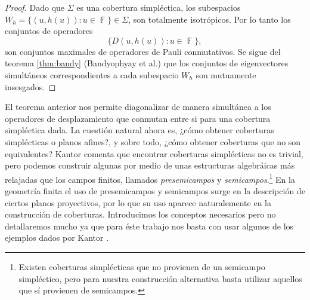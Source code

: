 \documentclass[a4paper,11pt]{report}
\DeclareMathOperator{\F}{\mathbb{F}}
\DeclareMathOperator{\tr}{tr}
\begin{document}
  \begin{proof}
    Dado que $\Sigma$ es una cobertura simpléctica, los
    subespacios $W_h = \{(u, h(u)) : u \in \F\} \in \Sigma$,
    son totalmente isotrópicos. Por lo tanto los conjuntos
    de operadores
    \[
      \{D(u,h(u)) : u \in \F\}, 
    \] 
    son conjuntos maximales de operadores de Pauli
    conmutativos. Se sigue del teorema \ref{thm:bandy}
    (Bandyophyay et al.) que los conjuntos de eigenvectores
    simultáneos correspondientes a cada subespacio $W_h$ son
    mutuamente insesgados.
  \end{proof}
  El teorema anterior nos permite diagonalizar de manera
  simultánea a los operadores de desplazamiento que conmutan
  entre si para una cobertura simpléctica dada.  La cuestión
  natural ahora es, ¿cómo obtener coberturas simplécticas o
  planos afines?, y sobre todo, ¿cómo obtener coberturas que
  no son equivalentes?  Kantor comenta que encontrar
  coberturas simplécticas no es trivial, pero podemos
  construir algunas por medio de unas estructuras
  algebráicas más relajadas que los campos finitos, llamados
  \textit{presemicampos} y
  \textit{semicampos}.\footnote{Existen coberturas
    simplécticas que no provienen de un semicampo
  simpléctico, pero para nuestra construcción alternativa
  basta utilizar aquellos que sí provienen de semicampos.}
  En la geometría finita el uso de presemicampos y
  semicampos surge en la descripción de ciertos planos
  proyectivos, por lo que su uso aparece naturalemente en la
  construcción de coberturas.  Introducimos los conceptos
  necesarios pero no detallaremos mucho ya que para éste
  trabajo nos basta con usar algunos de los ejemplos dados
  por Kantor \cite{kantor2012}.
\end{document}
